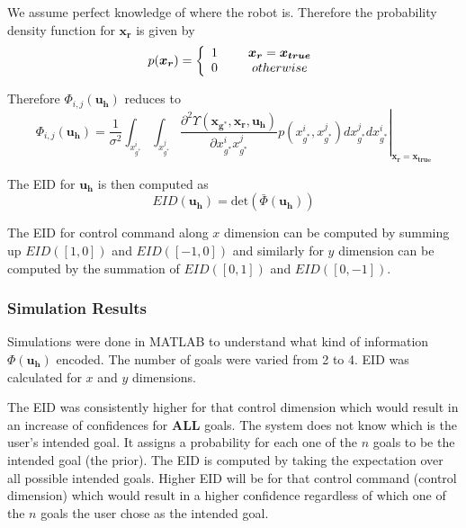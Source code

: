 \documentclass[]{article}
\begin{document}
We assume perfect knowledge of where the robot is. Therefore
the probability density function for $\boldsymbol{x_r}$ is given by
\begin{align*}
p(\boldsymbol{x_r}) = \left\{ 
\begin{array}{cc} 
1 & \hspace{5mm} \boldsymbol{x_r}=\boldsymbol{x_{true}} \\
0 & \hspace{5mm} otherwise
\end{array}\right. 
\end{align*}

Therefore $\Phi_{i,j}(\boldsymbol{u_h})$ reduces to 
\begin{equation*}
\Phi_{i,j}(\boldsymbol{u_h}) = \left.\frac{1}{\sigma^2}\int_{x_{g^*}^i}\int_{x_{g^*}^j}\frac{\partial^2\Upsilon(\boldsymbol{x_{g^*}}, \boldsymbol{x_r}, \boldsymbol{u_h})}{\partial x_{g^*}^ix_{g^*}^j}p(x_{g^*}^i, x_{g^*}^j)dx_{g^*}^jdx_{g^*}^i\right\vert_{\boldsymbol{x_r} = \boldsymbol{x_{true}}}
\end{equation*}

The EID for $\boldsymbol{u_h}$ is then computed as 
\begin{equation*}
	EID(\boldsymbol{u_h}) = \text{det}(\bar{\Phi}(\boldsymbol{u_h}))
\end{equation*}

The EID for control command along $x$ dimension can be computed by summing up $EID([1,0])$ and $EID([-1,0])$ and similarly for $y$ dimension can be computed by the summation of $EID([0,1])$ and $EID([0,-1])$.

\subsubsection*{Simulation Results}
Simulations were done in MATLAB to understand what kind of information $\Phi(\boldsymbol{u_h})$ encoded. The number of goals were varied from 2 to 4. EID was calculated for $x$ and $y$ dimensions. 

The EID was consistently higher for that control dimension which would result in an increase of confidences for \textbf{ALL} goals. The system does not know which is the user's intended goal. It assigns a probability for each one of the $n$ goals to be the intended goal (the prior). The EID is computed by taking the expectation over all possible intended goals. Higher EID will be for that control command (control dimension) which would result in a higher confidence regardless of which one of the $n$ goals the user chose as the intended goal. 
\end{document}
